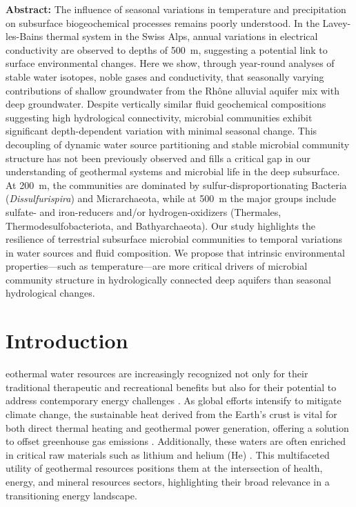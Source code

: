 \newpage
\noindent
\textbf{Abstract:} The influence of seasonal variations in temperature and precipitation on subsurface biogeochemical processes remains poorly understood.
In the Lavey-les-Bains thermal system in the Swiss Alps, annual variations in electrical conductivity are observed to depths of \SI{500}{\metre}, suggesting a potential link to surface environmental changes.
Here we show, through year-round analyses of stable water isotopes, noble gases and conductivity, that seasonally varying contributions of shallow groundwater from the Rhône alluvial aquifer mix with deep groundwater.
Despite vertically similar fluid geochemical compositions suggesting high hydrological connectivity, microbial communities exhibit significant depth-dependent variation with minimal seasonal change.
This decoupling of dynamic water source partitioning and stable microbial community structure has not been previously observed and fills a critical gap in our understanding of geothermal systems and microbial life in the deep subsurface.
At \SI{200}{\metre}, the communities are dominated by sulfur-disproportionating Bacteria (\textit{Dissulfurispira}) and Micrarchaeota, while at \SI{500}{\metre} the major groups include sulfate- and iron-reducers and/or hydrogen-oxidizers (Thermales, Thermodesulfobacteriota, and Bathyarchaeota).
Our study highlights the resilience of terrestrial subsurface microbial communities to temporal variations in water sources and fluid composition.
We propose that intrinsic environmental properties---such as temperature---are more critical drivers of microbial community structure in hydrologically connected deep aquifers than seasonal hydrological changes.

\section{Introduction}
eothermal water resources are increasingly recognized not only for their traditional therapeutic and recreational benefits but also for their potential to address contemporary energy challenges \citep{kagel2005guide}.
As global efforts intensify to mitigate climate change, the sustainable heat derived from the Earth’s crust is vital for both direct thermal heating and geothermal power generation, offering a solution to offset greenhouse gas emissions \citep{fridleifsson2008possible}. 
Additionally, these waters are often enriched in critical raw materials such as lithium and helium (He) \citep{harrison2014technologies, simmons2018strategic}.
This multifaceted utility of geothermal resources positions them at the intersection of health, energy, and mineral resources sectors, highlighting their broad relevance in a transitioning energy landscape.

